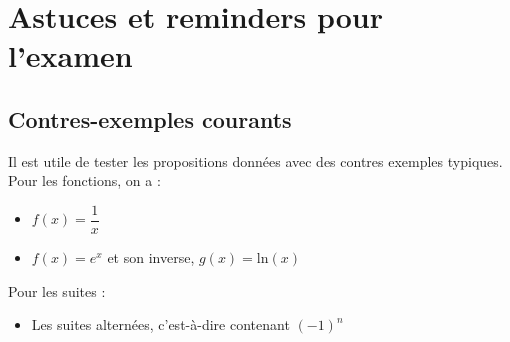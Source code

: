 \documentclass[10pt,a4paper]{book}
\begin{document}
\chapter{Astuces et reminders pour l'examen}
\section{Contres-exemples courants}
Il est utile de tester les propositions données avec des contres exemples typiques. Pour les fonctions, on a :
\begin{itemize}
\item $f(x) = \dfrac{1}{x}$
\item $f(x) = e^x$ et son inverse, $g(x) = \text{ln}(x)$
\end{itemize}
Pour les suites :
\begin{itemize}
\item Les suites alternées, c'est-à-dire contenant $(-1)^n$
\end{itemize}
\end{document}
